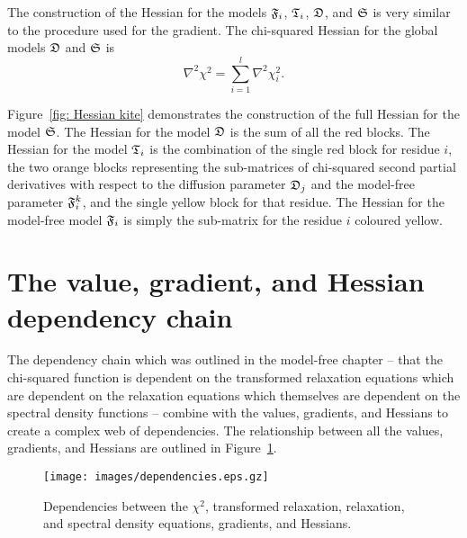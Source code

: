 The construction of the Hessian for the models $\mathfrak{F}_i$, $\mathfrak{T}_i$, $\mathfrak{D}$, and $\mathfrak{S}$ is very similar to the procedure used for the gradient.  The chi-squared Hessian for the global models $\mathfrak{D}$ and $\mathfrak{S}$ is
\begin{equation} \label{eq: spaceset Hessian}
    \nabla^2 \chi^2 = \sum_{i=1}^l \nabla^2 \chi^2_i.
\end{equation}

\noindent Figure~\ref{fig: Hessian kite} demonstrates the construction of the full Hessian for the model $\mathfrak{S}$.  The Hessian for the model $\mathfrak{D}$ is the sum of all the red blocks.  The Hessian for the model $\mathfrak{T}_i$ is the combination of the single red block for residue $i$, the two orange blocks representing the sub-matrices of chi-squared second partial derivatives with respect to the diffusion parameter $\mathfrak{D}_j$ and the model-free parameter $\mathfrak{F}_i^k$, and the single yellow block for that residue.  The Hessian for the model-free model $\mathfrak{F}_i$ is simply the sub-matrix for the residue $i$ coloured yellow.




\section{The value, gradient, and Hessian dependency chain}

The dependency chain which was outlined in the model-free chapter -- that the chi-squared function is dependent on the transformed relaxation equations which are dependent on the relaxation equations which themselves are dependent on the spectral density functions -- combine with the values, gradients, and Hessians to create a complex web of dependencies.  The relationship between all the values, gradients, and Hessians are outlined in Figure~\ref{fig: dependencies}.

\begin{figure}
\centerline{\texttt{[image: images/dependencies.eps.gz]}}
\caption[$\chi^2$ dependencies of the values, gradients, and Hessians.]{Dependencies between the $\chi^2$, transformed relaxation, relaxation, and spectral density equations, gradients, and Hessians.}\label{fig: dependencies}
\end{figure}



